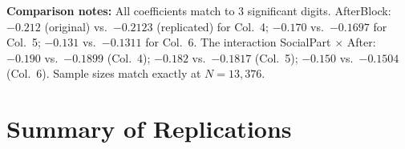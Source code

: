 \documentclass[11pt,a4paper]{article}
\begin{document}
\vspace{1cm}
\textbf{Comparison notes:} All coefficients match to 3 significant digits. AfterBlock: $-0.212$ (original) vs.\ $-0.2123$ (replicated) for Col.\ 4; $-0.170$ vs.\ $-0.1697$ for Col.\ 5; $-0.131$ vs.\ $-0.1311$ for Col.\ 6. The interaction SocialPart $\times$ After: $-0.190$ vs.\ $-0.1899$ (Col.\ 4); $-0.182$ vs.\ $-0.1817$ (Col.\ 5); $-0.150$ vs.\ $-0.1504$ (Col.\ 6). Sample sizes match exactly at $N = 13{,}376$.

\newpage

\section{Summary of Replications}
\end{document}

